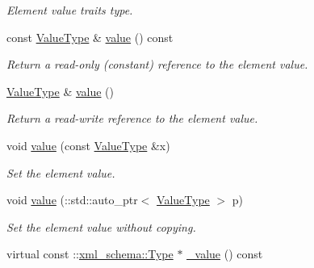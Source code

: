 \begin{DoxyCompactItemize}
\begin{DoxyCompactList}\small\item\em Element value traits type. \item\end{DoxyCompactList}\item 
const \hyperlink{classopenstack_1_1xml_1_1BackupOrResizeInProgressAPIFault}{ValueType} \& \hyperlink{classopenstack_1_1xml_1_1BackupOrResizeInProgress_ab834c150018eed1c5cd64f95e3350855}{value} () const 
\begin{DoxyCompactList}\small\item\em Return a read-\/only (constant) reference to the element value. \item\end{DoxyCompactList}\item 
\hyperlink{classopenstack_1_1xml_1_1BackupOrResizeInProgressAPIFault}{ValueType} \& \hyperlink{classopenstack_1_1xml_1_1BackupOrResizeInProgress_a0015a9c0de0788a3f0f19c6519f73ac6}{value} ()
\begin{DoxyCompactList}\small\item\em Return a read-\/write reference to the element value. \item\end{DoxyCompactList}\item 
void \hyperlink{classopenstack_1_1xml_1_1BackupOrResizeInProgress_a7ea98e4a01800fcc9b9f17a8918e84d2}{value} (const \hyperlink{classopenstack_1_1xml_1_1BackupOrResizeInProgressAPIFault}{ValueType} \&x)
\begin{DoxyCompactList}\small\item\em Set the element value. \item\end{DoxyCompactList}\item 
void \hyperlink{classopenstack_1_1xml_1_1BackupOrResizeInProgress_ab209e80f3a415b7ef7896f74479458ca}{value} (::std::auto\_\-ptr$<$ \hyperlink{classopenstack_1_1xml_1_1BackupOrResizeInProgressAPIFault}{ValueType} $>$ p)
\begin{DoxyCompactList}\small\item\em Set the element value without copying. \item\end{DoxyCompactList}\item 
virtual const ::\hyperlink{namespacexml__schema_ad34e8fd175bf4f9fece6c670b01aa239}{xml\_\-schema::Type} $\ast$ \hyperlink{classopenstack_1_1xml_1_1BackupOrResizeInProgress_ab7ad5f403deecc68d3b7339cd2ce5187}{\_\-value} () const 

\end{DoxyCompactItemize}
